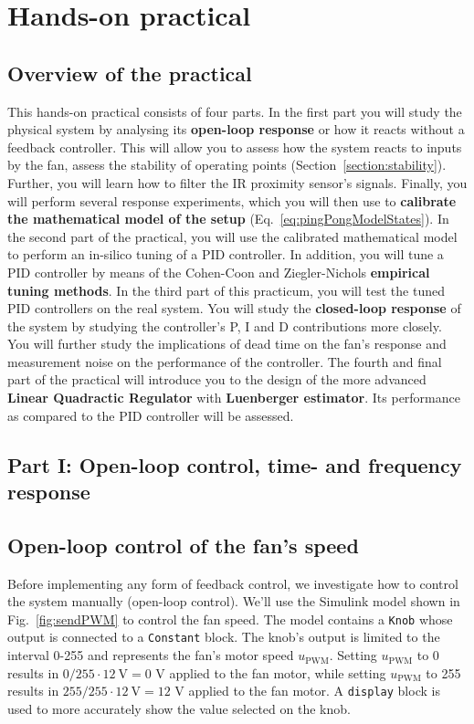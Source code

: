 \documentclass[10pt,twoside,openright]{article}
\begin{document}
\section{Hands-on practical}

\subsection*{Overview of the practical}
This hands-on practical consists of four parts. In the first part you will study the physical system by analysing its \textbf{open-loop response} or how it reacts without a feedback controller. This will allow you to assess how the system reacts to inputs by the fan, assess the stability of operating points (Section~\ref{section:stability}). Further, you will learn how to filter the IR proximity sensor's signals. Finally, you will perform several response experiments, which you will then use to \textbf{calibrate the mathematical model of the setup} (Eq.~\ref{eq:pingPongModelStates}). In the second part of the practical, you will use the calibrated mathematical model to perform an in-silico tuning of a PID controller. In addition, you will tune a PID controller by means of the Cohen-Coon and Ziegler-Nichols \textbf{empirical tuning methods}. In the third part of this practicum, you will test the tuned PID controllers on the real system. You will study the \textbf{closed-loop response} of the system by studying the controller's P, I and D contributions more closely. You will further study the implications of dead time on the fan's response and measurement noise on the performance of the controller. The fourth and final part of the practical will introduce you to the design of the more advanced \textbf{Linear Quadractic Regulator} with \textbf{Luenberger estimator}. Its performance as compared to the PID controller will be assessed.

\subsection*{Part I: Open-loop control, time- and frequency response}

\subsection{Open-loop control of the fan's speed}
Before implementing any form of feedback control, we investigate how to control the system manually (open-loop control). We'll use the Simulink model shown in Fig.~\ref{fig:sendPWM} to control the fan speed. The model contains a \texttt{Knob} whose output is connected to a \texttt{Constant} block. The knob's output is limited to the interval 0-255 and represents the fan's motor speed $u_{\text{PWM}}$. Setting $u_{\text{PWM}}$ to 0 results in $0/255 \cdot 12\ \text{V} = 0$ V applied to the fan motor, while setting $u_{\text{PWM}}$ to 255 results in $255/255 \cdot 12\ \text{V} = 12$ V applied to the fan motor. A \texttt{display} block is used to more accurately show the value selected on the knob.\\
\end{document}
